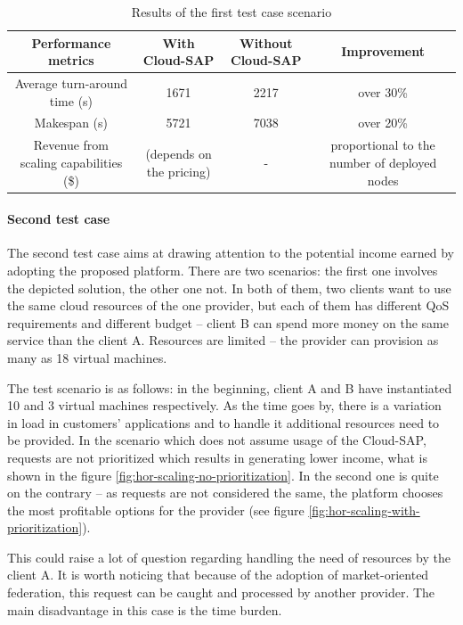 \documentclass[twocolumn]{svjour3}          %
\begin{document}
\begin{table}[ht]
  \renewcommand{\arraystretch}{2}
  \begin{tabular}{ | C | C | C | C | }
  \hline 
  \textbf{Performance metrics} & \textbf{With Cloud-SAP} & {\textbf{Without Cloud-SAP}} & \textbf{Improvement} \\ \hline
  
  Average turn-around time (s) &
  1671 &
  2217 &
  over 30\% \\ \hline

  Makespan (s) &
  5721 &
  7038 &
  over 20\% \\ \hline

  Revenue from scaling capabilities (\$) &
  (depends on the pricing) &
  - &
  proportional to the number of deployed nodes \\ \hline
\end{tabular}
\caption{Results of the first test case scenario}
\label{tab:test1-results}
\end{table}

\paragraph{Second test case}
The second test case aims at drawing attention to the potential income earned by adopting the proposed platform. There are two scenarios: the first one involves the depicted solution, the other one not. In both of them, two clients want to use the same cloud resources of the one provider, but each of them has different QoS requirements and different budget -- client B can spend more money on the same service than the client A. Resources are limited -- the provider can provision as many as 18 virtual machines.

The test scenario is as follows: in the beginning, client A and B have instantiated 10 and 3 virtual machines respectively. As the time goes by, there is a variation in load in customers' applications and to handle it additional resources need to be provided. In the scenario which does not assume usage of the Cloud-SAP, requests are not prioritized which results in generating lower income, what is shown in the figure \ref{fig:hor-scaling-no-prioritization}. In the second one is quite on the contrary -- as requests are not considered the same, the platform chooses the most profitable options for the provider (see figure \ref{fig:hor-scaling-with-prioritization}).

This could raise a lot of question regarding handling the need of resources by the client A. It is worth noticing that because of the adoption of market-oriented federation, this request can be caught and processed by another provider. The main disadvantage in this case is the time burden.
\end{document}
